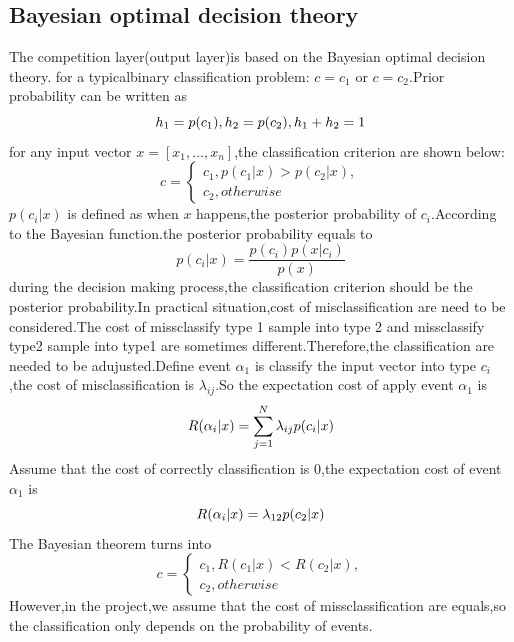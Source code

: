 \subsection{Bayesian optimal decision theory}
The competition layer(output layer)is based on the Bayesian optimal decision theory.
for a typicalbinary classification problem: $c=c_1$ or $c=c_2$.Prior probability can be written as
\begin{equation}
{h}_{1}=\\{p}({c}_{1}),{h}_{2}=\\{p}({c}_{2}),{h}_{1}+{h}_{2}=1
\end{equation}
for any input vector $x = [x_1,\ldots,x_n]$,the classification criterion are shown below:
\begin{equation}
    {c}=
    \begin{cases}
    c_1,p(c_1|x)>p(c_2|{x}),\\
    c_2,otherwise
    \end{cases}
\end{equation}
${p}({c}_{i}|{x})$ is defined as when $x$ happens,the posterior probability of $c_i$.According to the Bayesian function.the posterior probability equals to 
\begin{equation}
    p(c_i|x)=\frac{ p(c_i)p(x|c_i)}{ p(x)}
\end{equation}
during the decision making process,the classification criterion should be the posterior probability.In practical situation,cost of misclassification are need to be considered.The cost of missclassify type 1 sample into type 2 and missclassify type2 sample into type1 are sometimes different.Therefore,the classification are needed to be adujusted.Define event $\alpha_{1}$ is classify the input vector into type $c_i$,the cost of misclassification is $\lambda_{ij}$.So the expectation cost of apply event $\alpha_{1}$ is
\begin{equation}
    \\R(\alpha_i|\\x)=\sum_{j=1}^{N} \lambda_{ij}\\p(c_i|\\x)
\end{equation}
Assume that the cost of correctly classification is $0$,the expectation cost of event $\alpha_{1}$ is
\begin{equation}
     \\R(\alpha_i|\\x)= \lambda_{12}\\p(c_2|\\x)
\end{equation}
The Bayesian theorem turns into
\begin{equation}
    {c}=
    \begin{cases}
    c_1,R(c_1|x)<R(c_2|{x}),\\
    c_2,otherwise
    \end{cases}
\end{equation}
However,in the project,we assume that the cost of missclassification are equals,so the classification only depends on the probability of events.

